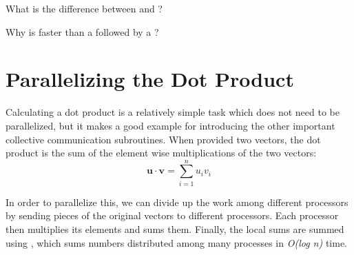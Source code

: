 









\begin{problem}
What is the difference between  and ?
\end{problem}

\begin{problem}
Why is  faster than a  followed by a ?
\end{problem}



\section*{Parallelizing the Dot Product}
Calculating a dot product is a relatively simple task which does not need to be parallelized, but it makes a good example for introducing the other important collective communication subroutines. When provided two vectors, the dot product is the sum of the element wise multiplications of the two vectors:
\[
\textbf{u} \cdot \textbf{v} = \sum_{i=1}^{n} u_i v_i
\]

In order to parallelize this, we can divide up the work among different processors by sending pieces of the original vectors to different processors. Each processor then multiplies its elements and sums them. Finally, the local sums are summed using , which sums numbers distributed among many processes in \emph{O(log n)} time.

